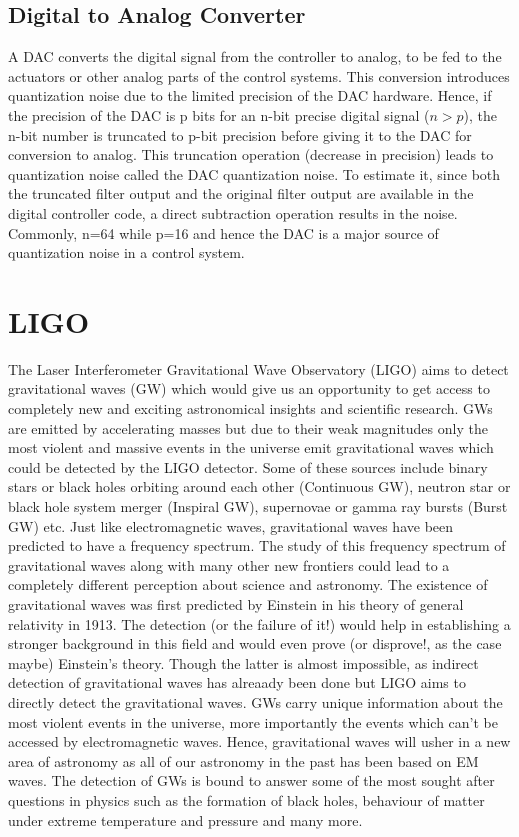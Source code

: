 \documentclass[colorlinks=true,pdfstartview=FitV,linkcolor=blue,
            citecolor=red,urlcolor=magenta]{ligodoc}
\begin{document}
	\subsection{Digital to Analog Converter}    		
    		A DAC converts the digital signal from the controller to analog, to be fed to the actuators or other analog parts of the control systems. This conversion introduces quantization noise due to the limited precision of the DAC hardware. Hence, if the precision of the DAC is p bits for an n-bit precise digital signal ($n>p$), the n-bit number is truncated to p-bit precision before giving it to the DAC for conversion to analog. This truncation operation (decrease in precision) leads to quantization noise called the DAC quantization noise. To estimate it, since both the truncated filter output and the original filter output are available in the digital controller code, a direct subtraction operation results in the noise. Commonly, n=64 while p=16 and hence the DAC is a major source of quantization noise in a control system.

\section{LIGO}
\label{ligo}
The Laser Interferometer Gravitational Wave Observatory (LIGO) \cite{LIGO} aims to detect gravitational waves (GW) \cite{GWD} which would give us an opportunity to get access to completely new and exciting astronomical insights and scientific research. GWs are emitted by accelerating masses but due to their weak magnitudes only the most violent and massive events in the universe emit gravitational waves which could be detected by the LIGO detector. Some of these sources include binary stars or black holes orbiting around each other (Continuous GW), neutron star or black hole system merger (Inspiral GW), supernovae or gamma ray bursts (Burst GW) etc. Just like electromagnetic waves, gravitational waves have been predicted to have a frequency spectrum. The study of this frequency spectrum of gravitational waves along with many other new frontiers could lead to a completely different perception about science and astronomy. The existence of gravitational waves was first predicted by Einstein in his theory of general relativity in 1913. The detection (or the failure of it!) would help in establishing a stronger background in this field and would even prove (or disprove!, as the case maybe) Einstein's theory. Though the latter is almost impossible, as indirect detection of gravitational waves has alreaady been done but LIGO aims to directly detect the gravitational waves. GWs carry unique information about the most violent events in the universe, more importantly the events which can't be accessed by electromagnetic waves. Hence, gravitational waves will usher in a new area of astronomy as all of our astronomy in the past has been based on EM waves. The detection of GWs is bound to answer some of the most sought after questions in physics such as the formation of black holes, behaviour of matter under extreme temperature and pressure and many more. 
\end{document}

